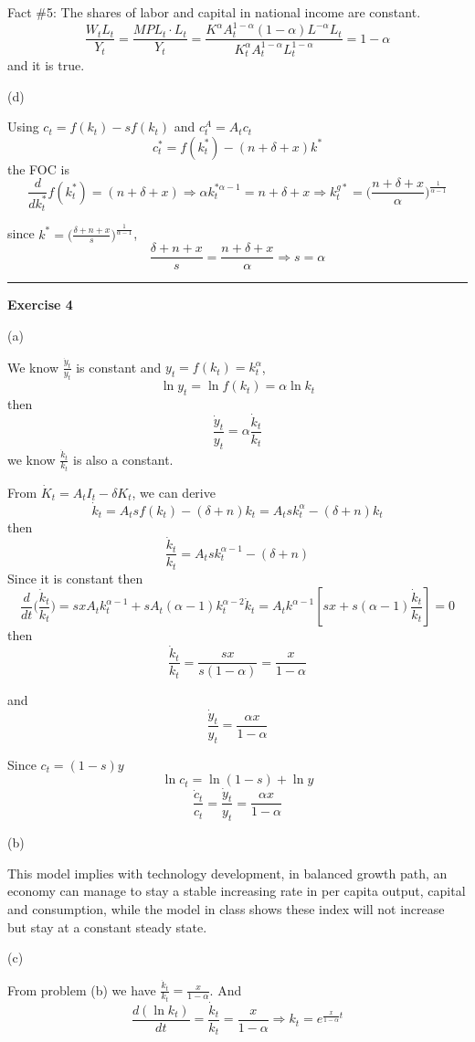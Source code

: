 \documentclass[letterpaper, 11pt]{article}
\newcommand{\1}{\mathds{1}}	%
\theoremstyle{definition}
\begin{document}
Fact \#5: The shares of labor and capital in national income are constant.
\[
  \frac{W_tL_t}{Y_t} = \frac{MPL_t \cdot L_t}{Y_t} = \frac{K^{\alpha}A_t^{1-\alpha}(1-\alpha)L^{-\alpha} L_t}{K_t^{\alpha}A_t^{1-\alpha}L_t^{1-\alpha}} = 1-\alpha
\]
and it is true.


(d)

Using $c_t = f(k_t) - sf(k_t)$ and $c^A_t = A_tc_t$
\[
  c_t^* = f(k_t^*) - (n+\delta + x)k^*
\]
the FOC is \[
  \frac{d}{dk_t^*}f(k_t^*) = (n+\delta + x) \Longrightarrow \alpha k_t^{* \alpha - 1} = n+ \delta + x \Longrightarrow k_t^{g*} = \Big(\frac{n+\delta+x}{\alpha}\Big)^{\frac{1}{\alpha-1}}
\]

since $k^* = \Big(\frac{\delta + n + x}{s}\Big)^{\frac{1}{\alpha-1}}$, \[
  \frac{\delta + n + x}{s} = \frac{n+\delta+x}{\alpha} \Longrightarrow s = \alpha
\]

\bigskip
\hrule
\bigskip

\textbf{Exercise 4}

(a)

We know $\frac{\dot{y}_t}{y_t}$ is constant and $y_t = f(k_t) = k_t^\alpha$, \[
  \ln y_t = \ln f(k_t) = \alpha \ln k_t
\] then \[
  \frac{\dot{y}_t}{y_t} = \alpha \frac{\dot{k}_t}{k_t}
\] we know $\frac{\dot{k}_t}{k_t}$ is also a constant.


From $\dot{K}_t = A_tI_t-\delta K_t$, we can derive \[
  \dot{k}_t = A_t sf(k_t) - (\delta +n)k_t = A_t s k_t^\alpha - (\delta+n)k_t
\] then \[
  \frac{\dot{k}_t}{k_t} = A_t s k_t^{\alpha-1} - (\delta + n)
\]
Since it is constant then \[
  \frac{d}{dt}\Big(\frac{\dot{k}_t}{k_t}\Big) = s x A_t k_t^{\alpha-1} + sA_t(\alpha-1)k_t^{\alpha-2}\dot{k}_t =A_t k^{\alpha-1}[sx + s(\alpha-1)\frac{\dot{k}_t}{k_t}] = 0
\] then \[
  \frac{\dot{k}_t}{k_t} = \frac{sx}{s(1-\alpha)} = \frac{x}{1-\alpha}
\]

and \[
  \frac{\dot{y}_t}{y_t} = \frac{\alpha x}{1-\alpha}
\]

Since $c_t = (1-s)y$ \[
  \ln c_t = \ln (1-s) + \ln y
\] \[
  \frac{\dot{c}_t}{c_t} = \frac{\dot{y}_t}{y_t} = \frac{\alpha x}{1-\alpha}
\]

(b)

This model implies with technology development, in balanced growth path, an economy can manage to stay a stable increasing rate in per capita output, capital and consumption, while the model in class shows these index will not increase but stay at a constant steady state.


(c)

From problem (b) we have $  \frac{\dot{k}_t}{k_t} = \frac{x}{1-\alpha}$. And
\[
  \frac{d(\ln k_t)}{dt} = \frac{\dot{k}_t}{k_t} = \frac{x}{1-\alpha} \Longrightarrow k_t = e^{\frac{x}{1-\alpha}t}
\]
\end{document}
